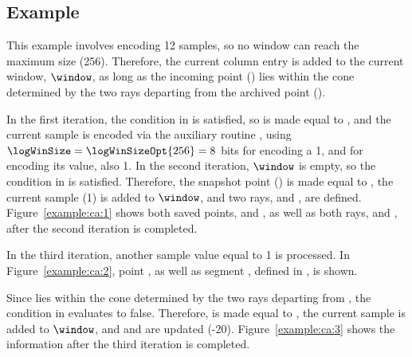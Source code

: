 




\subsection{Example}
\label{algo:ca:example}


\exampleIntro{\ref{example:ca:1}}


This example involves encoding 12 samples, so no window can reach the maximum size (256). Therefore, the current column entry is added to the current window, $\window$, as long as the incoming point (\incoming) lies within the cone determined by the two rays departing from the archived point (\archived).


In the first iteration, the condition in  is satisfied, so \archived is made equal to , and the current sample is encoded via the auxiliary routine \CAWinStart, using $\logWinSize = \logWinSizeOpt{256}=8$ bits for encoding a 1, and \tobitexp for encoding its value, also 1. In the second iteration, $\window$ is empty, so the condition in  is satisfied. Therefore, the snapshot point (\snapshot) is made equal to , the current sample (1) is added to $\window$, and two rays, \smin and \smax, are defined. Figure~\ref{example:ca:1} shows both saved points, \archived and \snapshot, as well as both rays, \smin and \smax, after the second iteration is completed.


\vspace{+5pt}


In the third iteration, another sample value equal to 1 is processed. In Figure~\ref{example:ca:2}, point , as well as segment , defined in , is shown.


\vspace{+5pt}


\clearpage


Since  lies within the cone determined by the two rays departing from \archived, the condition in  evaluates to false. Therefore, \snapshot is made equal to , the current sample is added to $\window$, and \smin and \smax are updated (-20). Figure~\ref{example:ca:3} shows the information after the third iteration is completed.


